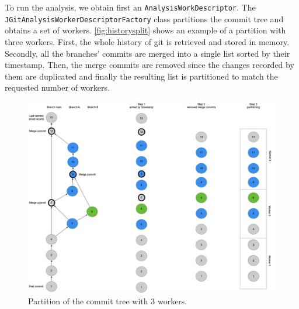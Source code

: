 To run the analysis, we obtain first an \texttt{AnalysisWorkDescriptor}. 
The \texttt{JGitAnalysisWorkerDescriptorFactory} class partitions the commit tree and obtains a set of workers. 
\autoref{fig:historysplit} shows an example of a partition with three workers. First, the whole history of git is retrieved and stored in memory. Secondly, all the branches' commits are merged into a single list sorted by their timestamp. 
Then, the merge commits are removed since the changes recorded by them are duplicated and finally the resulting list is partitioned to match the requested number of workers. 
\begin{figure}
    \center
    \includegraphics[width=\textwidth]{HistorySplit.jpg}
    \caption{Partition of the commit tree with 3 workers.}
    \label{fig:historysplit}
\end{figure}


